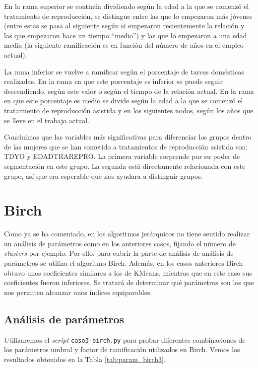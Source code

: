 \documentclass[a4paper, 20pt]{article}
\begin{document}
En la rama superior se continúa dividiendo según la edad a la que se comenzó el tratamiento de reproducción, se distingue entre las que lo empezaron más jóvenes (entre estas se pasa al siguiente según si empezaron recientemente la relación y las que empezaron hace un tiempo ``medio'') y las que lo empezaron a una edad media (la siguiente ramificación es en función del número de años en el empleo actual).

La rama inferior se vuelve a ramificar según el porcentaje de tareas domésticas realizadas. En la rama en que este porcentaje es inferior se puede seguir descendiendo, según este valor o según el tiempo de la relación actual. En la rama en que este porcentaje es medio se divide según la edad a la que se comenzó el tratamiento de reproducción asistida y en los siguientes nodos, según los años que se lleve en el trabajo actual.

Concluimos que las variables más significativas para diferenciar los grupos dentro de las mujeres que se han sometido a tratamientos de reproducción asistida son: TDYO y EDADTRAREPRO. La primera variable sorprende por su poder de segmentación en este grupo. La segunda está directamente relacionada con este grupo, así que era esperable que nos ayudara a distinguir grupos.

\section{Birch}
Como ya se ha comentado, en los algoritmos jerárquicos no tiene sentido realizar un análisis de parámetros como en los anteriores casos, fijando el número de \textit{clusters} por ejemplo. Por ello, para cubrir la parte de análisis de análisis de parámetros se utiliza el algoritmo Birch. Además, en los casos anteriores Birch obtuvo unos coeficientes similares a los de KMeans, mientras que en este caso sus coeficientes fueron inferiores. Se tratará de determinar qué parámetros son los que nos permiten alcanzar unos índices equiparables.

\subsection{Análisis de parámetros}
Utilizaremos el \textit{script} \texttt{caso3-birch.py} para probar diferentes combinaciones de los parámetros umbral y factor de ramificación utilizados en Birch. Vemos los resultados obtenidos en la Tabla \ref{tab:param_birch3}.
\end{document}
